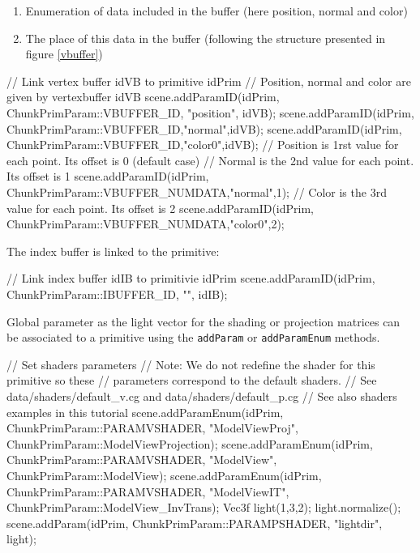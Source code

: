 \documentclass[a4paper,12pt,titlepage]{article}
\begin{document}
\begin{enumerate}
    \item Enumeration of data included in the buffer (here position, normal and color)
    \item The place of this data in the buffer (following the structure presented in figure \ref{vbuffer})
\end{enumerate}

\begin{codeflowvr_cpp}
    // Link vertex buffer idVB to primitive idPrim
    // Position, normal and color are given by vertexbuffer idVB
    scene.addParamID(idPrim, ChunkPrimParam::VBUFFER_ID, "position", idVB);
    scene.addParamID(idPrim, ChunkPrimParam::VBUFFER_ID,"normal",idVB);
    scene.addParamID(idPrim, ChunkPrimParam::VBUFFER_ID,"color0",idVB);
    // Position is 1rst value for each point. Its offset is 0 (default case)
    // Normal is the 2nd value for each point. Its offset is 1
    scene.addParamID(idPrim, ChunkPrimParam::VBUFFER_NUMDATA,"normal",1);
    // Color is the 3rd value for each point. Its offset is 2
    scene.addParamID(idPrim, ChunkPrimParam::VBUFFER_NUMDATA,"color0",2);
\end{codeflowvr_cpp} \par 

The index buffer is linked to the primitive:

\begin{codeflowvr_cpp} 
    // Link index buffer idIB to primitivie idPrim
    scene.addParamID(idPrim, ChunkPrimParam::IBUFFER_ID, "", idIB);
\end{codeflowvr_cpp} \par

Global parameter as the light vector for the shading or projection matrices can be associated to a primitive using the \texttt{addParam} or \texttt{addParamEnum} methods. 

\begin{codeflowvr_cpp}
    // Set shaders parameters
    // Note: We do not redefine the shader for this primitive so these
    // parameters correspond to the default shaders.
    // See data/shaders/default_v.cg and data/shaders/default_p.cg
    // See also shaders examples in this tutorial
    scene.addParamEnum(idPrim, ChunkPrimParam::PARAMVSHADER, "ModelViewProj", ChunkPrimParam::ModelViewProjection);
    scene.addParamEnum(idPrim, ChunkPrimParam::PARAMVSHADER, "ModelView", ChunkPrimParam::ModelView);
    scene.addParamEnum(idPrim, ChunkPrimParam::PARAMVSHADER, "ModelViewIT", ChunkPrimParam::ModelView_InvTrans);
    Vec3f light(1,3,2); light.normalize();
    scene.addParam(idPrim, ChunkPrimParam::PARAMPSHADER, "lightdir", light);
\end{codeflowvr_cpp} \par 
\end{document}
